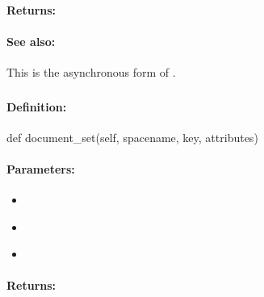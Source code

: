 \paragraph{Returns:}


\paragraph{See also:}  This is the asynchronous form of .

\pagebreak
\subsubsection{}
\label{api:python:document_set}


\paragraph{Definition:}
\begin{pythoncode}
def document_set(self, spacename, key, attributes)
\end{pythoncode}

\paragraph{Parameters:}
\begin{itemize}[noitemsep]
\item {}\\

\item {}\\

\item {}\\

\end{itemize}

\paragraph{Returns:}


\pagebreak
\subsubsection{}
\label{api:python:async_document_set}


